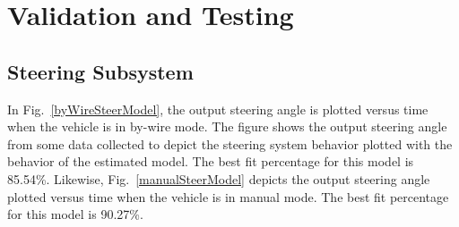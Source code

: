 \documentclass[journal,twoside,web]{ieeecolor}
\begin{document}
\section{Validation and Testing} \label{sec:simresults}
\subsection{Steering Subsystem}
In Fig.~\ref{byWireSteerModel}, the output steering angle is plotted versus time
when the vehicle is in by-wire mode. The figure shows the output steering angle
from some data collected to depict the steering system behavior plotted with the
behavior of the estimated model. The best fit percentage for this model is
85.54\%. Likewise, Fig.~\ref{manualSteerModel} depicts the output steering angle
plotted versus time when the vehicle is in manual mode. The best fit percentage
for this model is 90.27\%.


\end{document}
